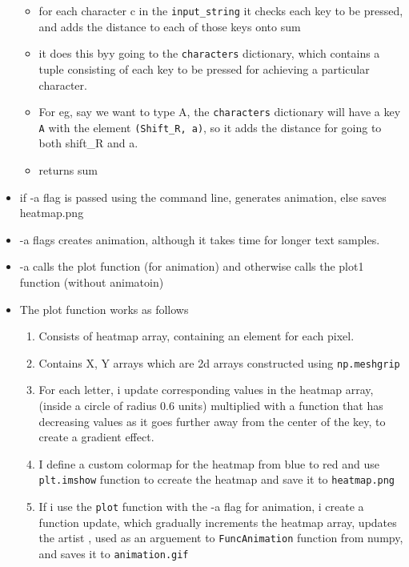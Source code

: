 \begin{itemize}
  \begin{itemize}
  \tightlist
  \item
    for each character c in the \texttt{input\_string} it checks each
    key to be pressed, and adds the distance to each of those keys onto
    sum
  \item
    it does this byy going to the \texttt{characters} dictionary, which
    contains a tuple consisting of each key to be pressed for achieving
    a particular character.
  \item
    For eg, say we want to type A, the \texttt{characters} dictionary
    will have a key \texttt{A} with the element
    \texttt{(\textquotesingle{}Shift\_R\textquotesingle{},\ \textquotesingle{}a\textquotesingle{})},
    so it adds the distance for going to both shift\_R and a.
  \item
    returns sum
  \end{itemize}
\item
  if -a flag is passed using the command line, generates animation, else
  saves heatmap.png
\item
  -a flags creates animation, although it takes time for longer text
  samples.
\item
  -a calls the plot function (for animation) and otherwise calls the
  plot1 function (without animatoin)
\item
  The plot function works as follows

  \begin{enumerate}
  \def\labelenumi{\arabic{enumi}.}
  \tightlist
  \item
    Consists of heatmap array, containing an element for each pixel.
  \item
    Contains X, Y arrays which are 2d arrays constructed using
    \texttt{np.meshgrip}
  \item
    For each letter, i update corresponding values in the heatmap array,
    (inside a circle of radius 0.6 units) multiplied with a function
    that has decreasing values as it goes further away from the center
    of the key, to create a gradient effect.
  \item
    I define a custom colormap for the heatmap from blue to red and use
    \texttt{plt.imshow} function to ccreate the heatmap and save it to
    \texttt{heatmap.png}
  \item
    If i use the \texttt{plot} function with the -a flag for animation,
    i create a function update, which gradually increments the heatmap
    array, updates the artist , used as an arguement to
    \texttt{FuncAnimation} function from numpy, and saves it to
    \texttt{animation.gif}
  \end{enumerate}
\end{itemize}

